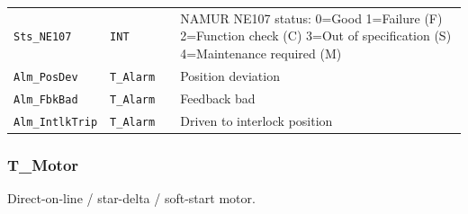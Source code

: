 {\begin{longtable}{@{}>{\raggedright\arraybackslash}p{3.4cm}>{\raggedright\arraybackslash}p{3.3cm}>{\raggedright\arraybackslash}p{1.3cm}>{\raggedright\arraybackslash}p{6.4cm}@{}}
\texttt{Sts\_NE107} & \texttt{INT} &  & NAMUR NE107 status: 0=Good 1=Failure (F) 2=Function check (C) 3=Out of specification (S) 4=Maintenance required (M) \\
\texttt{Alm\_PosDev} & \texttt{T\_Alarm} &  & Position deviation \\
\texttt{Alm\_FbkBad} & \texttt{T\_Alarm} &  & Feedback bad \\
\texttt{Alm\_IntlkTrip} & \texttt{T\_Alarm} &  & Driven to interlock position \\
\bottomrule
\end{longtable}
}
\subsubsection*{T\_Motor}
\label{app:pclib:tmotor}
Direct-on-line /\allowbreak{} star-delta /\allowbreak{} soft-start motor.

